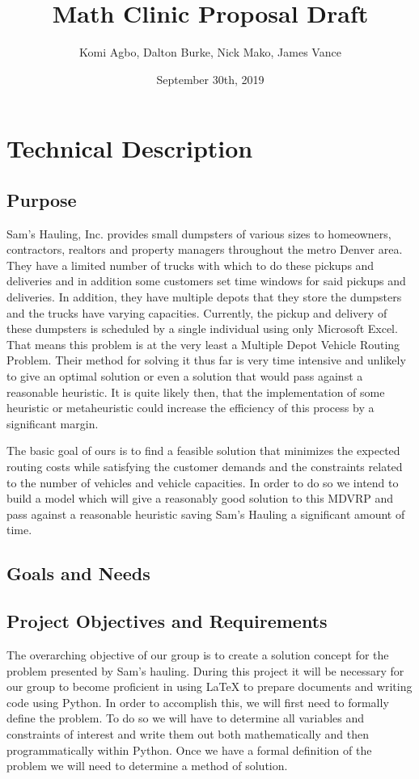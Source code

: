 \documentclass{article}
\title{Math Clinic Proposal Draft}
\author{Komi Agbo, Dalton Burke, Nick Mako, James Vance}
\date{September 30th, 2019}
\begin{document}
\maketitle
\newpage

\section{Technical Description}

\subsection{Purpose}
Sam’s Hauling, Inc. provides small dumpsters of various sizes to homeowners, contractors, realtors and property managers throughout the metro Denver area. They have a limited number of trucks with which to do these pickups and deliveries and in addition some customers set time windows for said pickups and deliveries. In addition, they have multiple depots that they store the dumpsters and the trucks have varying capacities. Currently, the pickup and delivery of these dumpsters is scheduled by a single individual using only Microsoft Excel. That means this problem is at the very least a Multiple Depot Vehicle Routing Problem. Their method for solving it thus far is very time intensive and unlikely to give an optimal solution or even a solution that would pass against a reasonable heuristic. It is quite likely then, that the implementation of some heuristic or metaheuristic could increase the efficiency of this process by a significant margin.

The basic goal of ours is to find a feasible solution that minimizes the expected routing costs while satisfying the customer demands and the constraints related to the number of vehicles and vehicle capacities. In order to do so we intend to build a model which will give a reasonably good solution to this MDVRP and pass against a reasonable heuristic saving Sam’s Hauling a significant amount of time.


\subsection{Goals and Needs}

\subsection{Project Objectives and Requirements}
The overarching objective of our group is to create a solution concept for the problem presented by Sam's hauling.
During this project it will be necessary for our group to become proficient in using LaTeX to prepare documents and writing code using Python.
In order to accomplish this, we will first need to formally define the problem. To do so we will have to determine all variables and constraints of interest and write them out both mathematically and then programmatically within Python.
Once we have a formal definition of the problem we will need to determine a method of solution.
\end{document}
